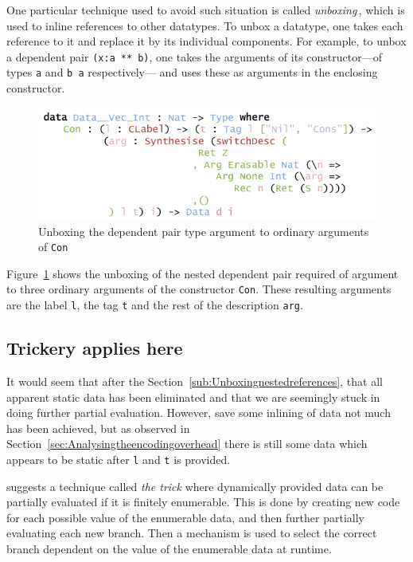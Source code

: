\documentclass{ituthesis}
\newcommand{\ttconstructor}[1]{\textcolor{constructor-color}{\texttt{#1}}}
\newcommand{\tttype}[1]{\textcolor{type-color}{\texttt{#1}}}
\newcommand{\ttvar}[1]{\textcolor{local-var-color}{\texttt{#1}}}
\theoremstyle{break}
\begin{document}
One particular technique used to avoid such situation is called \textit{unboxing}\,\autocite{Jones91unboxedvalues,Leroy97theeffectiveness}, which is used to inline references to other datatypes.
To unbox a datatype, one takes each reference to it and replace it by its individual components.
For example, to unbox a dependent pair \tttype{(}\ttvar{x}\texttt{:}\ttvar{a}~\tttype{**}~\ttvar{b}\tttype{)}, one takes the arguments of its constructor---of types \ttvar{a} and \ttvar{b a} respectively---
and uses these as arguments in the enclosing constructor.

\begin{figure}[ht]
\begin{center}
    \includegraphics[scale=0.5]{Figures/PEUnboxing.png}
\end{center}
\caption{Unboxing the dependent pair type argument to ordinary arguments of \ttconstructor{Con}}
\label{fig:peunbox}
\end{figure}

Figure~\ref{fig:peunbox} shows the unboxing of the nested dependent pair required of argument to three ordinary arguments of the constructor \ttconstructor{Con}.
These resulting arguments are the label \ttvar{l}, the tag \ttvar{t} and the rest of the description \ttvar{arg}.

\subsection{Trickery applies here}
\label{sub:Trickery applies here}
It would seem that after the Section~\ref{sub:Unboxingnestedreferences}, that all apparent static data has been eliminated and that we are seemingly stuck in doing further partial evaluation.
However, save some inlining of data not much has been achieved, but as observed in Section~\ref{sec:Analysingtheencodingoverhead} there is still some data which appears to be static after \ttvar{l} and \ttvar{t} is provided.

\textcite{Jones:1993:PEA:153676} suggests a technique called \textit{the trick} where dynamically provided data can be partially evaluated if it is finitely enumerable.
This is done by creating new code for each possible value of the enumerable data, and then further partially evaluating each new branch.
Then a mechanism is used to select the correct branch dependent on the value of the enumerable data at runtime.
\end{document}
